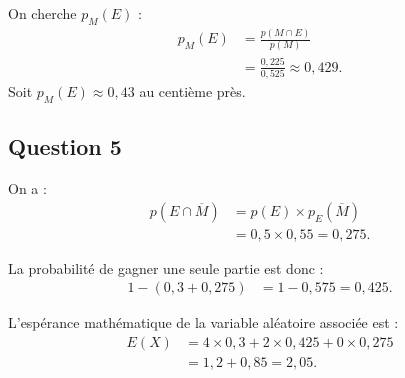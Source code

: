 	On cherche $p_M(E)$ :
	\begin{align*}
		p_M(E) &= \frac{p(M \cap E)}{p(M)} \\
		&= \frac{0,225}{0,525} \approx 0,429.
	\end{align*}
	Soit $p_M(E) \approx 0,43$ au centième près.
	
	\subsection*{Question 5}
	
	On a :
	\begin{align*}
		p(E \cap \overline{M}) &= p(E) \times p_E(\overline{M}) \\
		&= 0,5 \times 0,55 = 0,275.
	\end{align*}
	
	La probabilité de gagner une seule partie est donc :
	\begin{align*}
		1 - (0,3 + 0,275) &= 1 - 0,575 = 0,425.
	\end{align*}
	
	L'espérance mathématique de la variable aléatoire associée est :
	\begin{align*}
		E(X) &= 4 \times 0,3 + 2 \times 0,425 + 0 \times 0,275 \\
		&= 1,2 + 0,85 = 2,05.
	\end{align*}

